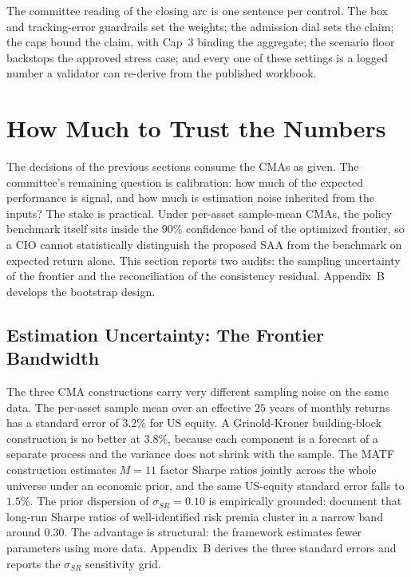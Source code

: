 \documentclass[pdftex,12pt,a4paper]{article}
\begin{document}
The committee reading of the closing arc is one sentence per control. The box and tracking-error guardrails set the weights; the admission dial sets the claim; the caps bound the claim, with Cap~3 binding the aggregate; the scenario floor backstops the approved stress case; and every one of these settings is a logged number a validator can re-derive from the published workbook.


\sectionfont{\MakeUppercase}
\section*{How Much to Trust the Numbers}\label{sec:trust}

The decisions of the previous sections consume the CMAs as given. The committee's remaining question is calibration: how much of the expected performance is signal, and how much is estimation noise inherited from the inputs? The stake is practical. Under per-asset sample-mean CMAs, the policy benchmark itself sits inside the $90\%$ confidence band of the optimized frontier, so a CIO cannot statistically distinguish the proposed SAA from the benchmark on expected return alone. This section reports two audits: the sampling uncertainty of the frontier and the reconciliation of the consistency residual. Appendix~B develops the bootstrap design.

\subsection*{Estimation Uncertainty: The Frontier Bandwidth}\label{subsec:trust_bootstrap}

The three CMA constructions carry very different sampling noise on the same data. The per-asset sample mean over an effective $25$ years of monthly returns has a standard error of $3.2\%$ for US equity. A Grinold-Kroner building-block construction is no better at $3.8\%$, because each component is a forecast of a separate process and the variance does not shrink with the sample. The MATF construction estimates $M=11$ factor Sharpe ratios jointly across the whole universe under an economic prior, and the same US-equity standard error falls to $1.5\%$. The prior dispersion of $\sigma_{SR}=0.10$ is empirically grounded: \citet{Lemperiere2017} document that long-run Sharpe ratios of well-identified risk premia cluster in a narrow band around $0.30$. The advantage is structural: the framework estimates fewer parameters using more data. Appendix~B derives the three standard errors and reports the $\sigma_{SR}$ sensitivity grid.
\end{document}
